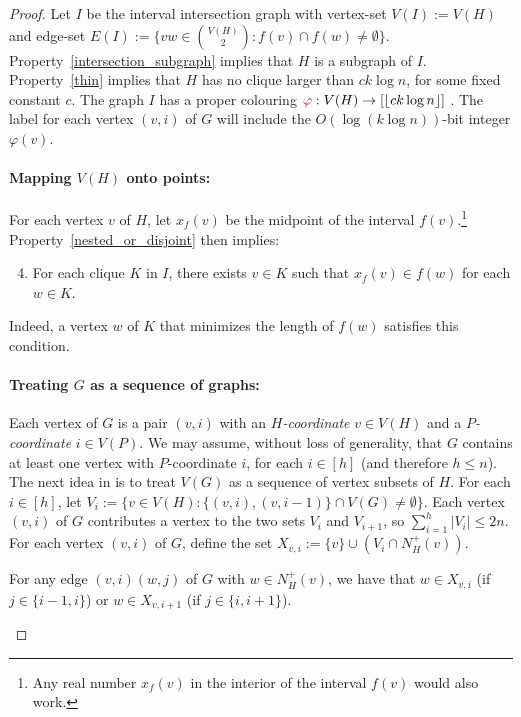 \documentclass[twoside,leqno]{article}
\makeatletter
\renewcommand{\le}{\leqslant}
\newcommand{\defin}[1]{\emph{\textcolor{brightmaroon}{#1}}}
\def\mathcolor#1#{\@mathcolor{#1}}
\def\@mathcolor#1#2#3{%
  \protect\leavevmode
  \begingroup
    \color#1{#2}#3%
  \endgroup
}
\newcommand{\mathdefin}[1]{\mathcolor{brightmaroon}{#1}}
\newcommand{\Oh}{O}
\makeatother
\begin{document}
\begin{proof}
  Let $I$ be the interval intersection graph with vertex-set $V(I):=V(H)$ and edge-set $E(I):=\{vw\in\binom{V(H)}{2}:f(v)\cap f(w)\neq\emptyset\}$.
  Property~\ref{intersection_subgraph} implies that $H$ is a subgraph of $I$. Property~\ref{thin} implies that $H$ has no clique larger than $ck\log n$, for some fixed constant $c$.
  The graph $I$ has a proper colouring $\mathdefin{\varphi}:V(H)\to[\lfloor ck\log n\rfloor]$ \cite{gilmore.hoffman:characterization}.
  The label for each vertex $(v,i)$ of $G$ will include the $\Oh(\log (k\log n))$-bit integer $\varphi(v)$.

  \paragraph{Mapping $V(H)$ onto points:}
  For each vertex $v$ of $H$, let $x_f(v)$ be the midpoint of the interval $f(v)$.\footnote{Any real number $x_f(v)$ in the interior of the interval $f(v)$ would also work.}  Property~\ref{nested_or_disjoint} then implies:
  \begin{enumerate}[nosep,label=(I\arabic*)]\setcounter{enumi}{3}
    \item\label{clique_property} For each clique $K$ in $I$, there exists $v\in K$ such that $x_f(v)\in f(w)$ for each $w\in K$.
  \end{enumerate}
  Indeed, a vertex $w$ of $K$ that minimizes the length of $f(w)$ satisfies this condition.

  \paragraph{Treating $G$ as a sequence of graphs:}
  Each vertex of $G$ is a pair $(v,i)$ with an \defin{$H$-coordinate} $v\in V(H)$ and a \defin{$P$-coordinate} $i\in V(P)$.
  We may assume, without loss of generality, that $G$ contains at least one vertex with $P$-coordinate $i$, for each $i\in[h]$ (and therefore $h\le n$).
  The next idea in \cite{dujmovic.esperet.ea:adjacency} is to treat $V(G)$ as a sequence of vertex subsets of $H$.
  For each $i\in[h]$, let $V_i:=\{v\in V(H): \{(v,i),(v,i-1)\}\cap V(G)\neq\emptyset \}$.    Each vertex $(v,i)$ of $G$ contributes a vertex to the two sets $V_{i}$ and $V_{i+1}$, so $\sum_{i=1}^h |V_i|\le 2n$.  For each vertex $(v,i)$ of $G$, define the set $X_{v,i}:= \{v\}\cup (V_i\cap N^+_H(v))$.

  \begin{obs}\label{x_v_i_sufficient}
    For any edge $(v,i)(w,j)$ of $G$ with $w\in N^+_H(v)$, we have that $w\in X_{v,i}$ (if $j\in\{i-1,i\}$) or $w\in X_{v,i+1}$ (if $j\in\{i,i+1\}$).
  \end{obs}


\end{proof}
\end{document}
